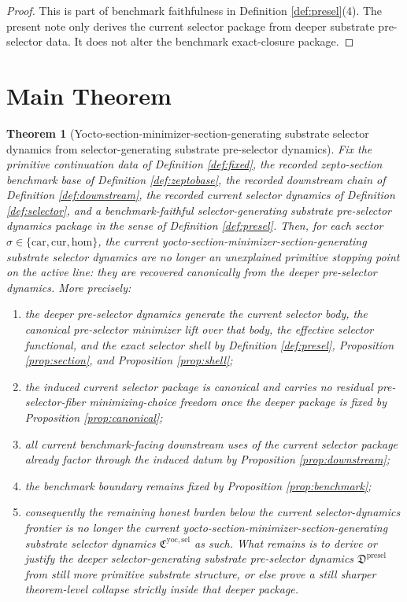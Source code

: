\documentclass[11pt]{article}
\newcommand{\Car}{\mathrm{car}}
\newcommand{\Cur}{\mathrm{cur}}
\newcommand{\Hom}{\mathrm{hom}}
\newcommand{\YoctoSelectorPackage}{\mathfrak C^{\mathrm{yoc,sel}}}
\newcommand{\PreSelectorPackage}{\mathfrak D^{\mathrm{presel}}}
\newtheorem{theorem}{Theorem}
\begin{document}
\begin{proof}
This is part of benchmark faithfulness in Definition \ref{def:presel}(4). The present note only derives the current selector package from deeper substrate pre-selector data. It does not alter the benchmark exact-closure package.
\end{proof}

\section{Main Theorem}

\begin{theorem}[Yocto-section-minimizer-section-generating substrate selector dynamics from selector-generating substrate pre-selector dynamics]
\label{thm:main}
Fix the primitive continuation data of Definition \ref{def:fixed}, the recorded zepto-section benchmark base of Definition \ref{def:zeptobase}, the recorded downstream chain of Definition \ref{def:downstream}, the recorded current selector dynamics of Definition \ref{def:selector}, and a benchmark-faithful selector-generating substrate pre-selector dynamics package in the sense of Definition \ref{def:presel}. Then, for each sector \(\sigma\in\{\Car,\Cur,\Hom\}\), the current yocto-section-minimizer-section-generating substrate selector dynamics are no longer an unexplained primitive stopping point on the active line: they are recovered canonically from the deeper pre-selector dynamics. More precisely:
\begin{enumerate}
    \item the deeper pre-selector dynamics generate the current selector body, the canonical pre-selector minimizer lift over that body, the effective selector functional, and the exact selector shell by Definition \ref{def:presel}, Proposition \ref{prop:section}, and Proposition \ref{prop:shell};
    \item the induced current selector package is canonical and carries no residual pre-selector-fiber minimizing-choice freedom once the deeper package is fixed by Proposition \ref{prop:canonical};
    \item all current benchmark-facing downstream uses of the current selector package already factor through the induced datum by Proposition \ref{prop:downstream};
    \item the benchmark boundary remains fixed by Proposition \ref{prop:benchmark};
    \item consequently the remaining honest burden below the current selector-dynamics frontier is no longer the current yocto-section-minimizer-section-generating substrate selector dynamics \(\YoctoSelectorPackage\) as such. What remains is to derive or justify the deeper selector-generating substrate pre-selector dynamics \(\PreSelectorPackage\) from still more primitive substrate structure, or else prove a still sharper theorem-level collapse strictly inside that deeper package.
\end{enumerate}
\end{theorem}
\end{document}
